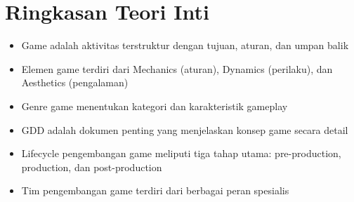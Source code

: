 \documentclass[../../main.tex]{subfiles}
\begin{document}
\section{Ringkasan Teori Inti}

\begin{itemize}
\item Game adalah aktivitas terstruktur dengan tujuan, aturan, dan umpan balik
\item Elemen game terdiri dari Mechanics (aturan), Dynamics (perilaku), dan Aesthetics (pengalaman)
\item Genre game menentukan kategori dan karakteristik gameplay
\item GDD adalah dokumen penting yang menjelaskan konsep game secara detail
\item Lifecycle pengembangan game meliputi tiga tahap utama: pre-production, production, dan post-production
\item Tim pengembangan game terdiri dari berbagai peran spesialis
\end{itemize}









\end{document}
